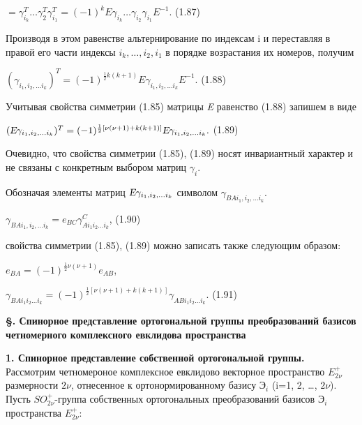 \documentclass{article}
\begin{document}
{\begin{center}
$=\gamma^{T}_{i_k} \dots \gamma^{T}_2\gamma^{T}_{i_1}=(-1)^{k}E\gamma_{i_k} \dots \gamma_{i_2}\gamma_{i_1}E^{-1}.$     (1.87)\par
\end{center}
Производя в этом равенстве альтернирование по индексам i и переставляя в правой его части индексы $i_k, \dots, i_2,i_1$ в порядке возрастания их номеров, получим \par
\begin{center}
$(\gamma_{i_1,i_2,\dots i_k})^{T}=(-1)^{\frac{1}{2}k(k+1)}E\gamma_{i_1,i_2,\dots i_k}E^{-1}$.     (1.88) \par
\end{center}
Учитывая свойства симметрии (1.85) матрицы \textsl{E} равенство (1.88) запишем в виде\par
\begin{center}
$(\textsl{E}\gamma_{i_1,i_2,\dots i_k})^{T}=(-1)^{\frac{1}{2}[\nu(\nu+1)+k(k+1)]}\textsl{E}\gamma_{i_1,i_2,\dots i_k}.$ (1.89)\par
\end{center}
Очевидно, что свойства симметрии (1.85), (1.89) носят инвариантный характер и не связаны с конкретным выбором матриц $\gamma_i$.\par
Обозначая элементы матриц $\textsl{E}\gamma_{i_1,i_2,\dots i_k}$ символом $\gamma_{BA i_1,i_2,\dots i_k}$.\par
\begin{center}
$\gamma_{BA i_1,i_2,\dots i_k}=e_{BC}\gamma^{C}_{A i_1 i_2 \dots i_k}$,      (1.90)\par
\end{center}
свойства симметрии (1.85), (1.89) можно записать также следующим образом: \par
\begin{center}
$e_{BA}=(-1)^{\frac{1}{2}\nu(\nu+1)}e_{AB}$,\par
$\gamma_{BA i_1 i_2 \dots i_k}=(-1)^{\frac{1}{2}[\nu(\nu+1)+k(k+1)]}\gamma_{AB i_1 i_2 \dots i_k}.$ (1.91)\par
\end{center}
\textbf
{\S. Спинорное представление ортогональной группы преобразований базисов четномерного комплексного евклидова пространства}\par
\textbf
{1. Спинорное представление собственной ортогональной группы.} Рассмотрим четномероное комплексное евклидово векторное пространство $E^{+}_{2\nu}$ размерности $2\nu$, отнесенное к ортонормированному базису \textsl{$Э_i$} (i=1, 2, \dots, $2\nu$). Пусть $SO^{+}_{2\nu}$-группа собственных ортогональных преобразований базисов $Э_i$ пространства $E^{+}_{2\nu}$:\par
}
\end{document}
